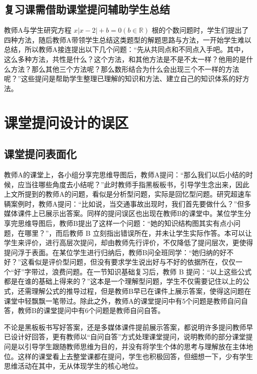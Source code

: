 \subsection{复习课需借助课堂提问辅助学生总结}

教师A与学生研究方程 $x |x - 2| + b = 0 (b \in \mathbb{R})$ 根的个数问题时，学生们提出了四种方法，随后教师A带领学生总结这类题型的解题思路与方法，一开始学生难以总结，所以教师A接连提出以下几个问题：“先从共同点和不同点入手吧。其中，这么多种方法，共性是什么？这个方法，和其他方法是不是不太一样？他用的是什么方法？那么其他三个方法呢？那么数形结合为什么会出现三个不一样的方法呢？”这些提问是帮助学生整理已理解的知识和方法、建立自己的知识体系的好方法。



\section{课堂提问设计的误区}

\subsection{课堂提问表面化}

教师A的课堂上，各小组分享完思维导图后，教师A提问：“那么我们以后小结的时候，应当往哪些角度去小结呢？”此时教师手指黑板板书，引导学生念出来，因此上文所提到的教师A的问题，看似是分析型问题，实际是回忆型问题。研究超速车辆案例时，教师A提问：“比如说，当交通事故出现时，我们首先要做什么？”但多媒体课件上已展示出答案。同样的提问误区也出现在教师B的课堂中。某位学生分享完思维导图后，教师B提出了这样一个问题：“她的知识结构图其实有点小问题，在哪里？”，而后教师 B 立刻指出错误所在，并未让学生实际作答。本可以让学生来评价，进行高层次提问，却由教师先行评价，不仅降低了提问层次，更使得提问浮于表面。在某位学生进行归纳后，教师B问全班同学：“她归纳的好不好？”这看似是评价型问题，但没有要求学生说出好与不好的依据所在，仅仅一个“好”字带过，浪费问题。在一节知识基础复习后，教师 B 提问：“以上这些公式都是在谁的基础上得来的？”这本是一个理解型问题，学生不仅需要记住以上的公式，还需理解公式的推导过程，但是教师B早已在课件上展示答案，使得这问题在课堂中轻飘飘一笔带过。除此之外，教师A的课堂提问中有5个问题是教师自问自答，教师B的课堂提问中有6个问题是教师自问自答。

不论是黑板板书写好答案，还是多媒体课件提前展示答案，都说明许多提问教师早已设计好回答，更有教师以“自问自答”方式处理课堂提问，说明教师的部分课堂提问是以引导学生跟随教师思维为目的，并没有将学生个体的思考与理解放在主体地位。这样的课堂看上去整堂课都在提问，学生也积极回答，但细想一下，少有学生思维活动在其中，无从体现学生的核心地位。


